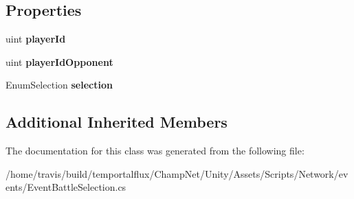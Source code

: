 \subsection*{Properties}
\begin{DoxyCompactItemize}
\item 
\hypertarget{class_event_battle_selection_acb6d735a144f55f502f35f3728e64fa7}{uint {\bfseries player\-Id}}\label{class_event_battle_selection_acb6d735a144f55f502f35f3728e64fa7}

\item 
\hypertarget{class_event_battle_selection_a4b91cf6aadc6b2c1073413811e764903}{uint {\bfseries player\-Id\-Opponent}}\label{class_event_battle_selection_a4b91cf6aadc6b2c1073413811e764903}

\item 
\hypertarget{class_event_battle_selection_abb849e7b9c472030fd4237d81cfc3111}{Enum\-Selection {\bfseries selection}}\label{class_event_battle_selection_abb849e7b9c472030fd4237d81cfc3111}

\end{DoxyCompactItemize}
\subsection*{Additional Inherited Members}


The documentation for this class was generated from the following file\-:\begin{DoxyCompactItemize}
\item 
/home/travis/build/temportalflux/\-Champ\-Net/\-Unity/\-Assets/\-Scripts/\-Network/events/Event\-Battle\-Selection.\-cs\end{DoxyCompactItemize}
